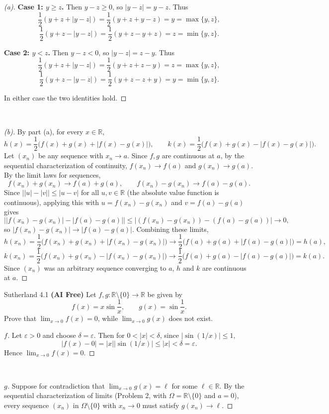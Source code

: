 \documentclass[minion]{homework}
\newcommand{\Reals}{\ensuremath{\mathbb R}}%
\begin{document}
\begin{problems}
\begin{proof}[(a)]
  \textbf{Case 1: $y\ge z$.} Then $y-z\ge0$, so $|y-z|=y-z$. Thus
  $$\frac12(y+z+|y-z|) = \frac12(y+z+y-z) = y = \max\{y,z\},$$
  $$\frac12(y+z-|y-z|) = \frac12(y+z-y+z) = z = \min\{y,z\}.$$

  \textbf{Case 2: $y<z$.} Then $y-z<0$, so $|y-z|=z-y$. Thus
  $$\frac12(y+z+|y-z|) = \frac12(y+z+z-y) = z = \max\{y,z\},$$
  $$\frac12(y+z-|y-z|) = \frac12(y+z-z+y) = y = \min\{y,z\}.$$

  In either case the two identities hold.
\end{proof}$ $
\begin{proof}[(b)]
  By part (a), for every $x\in\Reals$,
  $$h(x) = \frac12\big(f(x)+g(x)+|f(x)-g(x)|\big), \qquad k(x) = \frac12\big(f(x)+g(x)-|f(x)-g(x)|\big).$$
  Let $(x_n)$ be any sequence with $x_n\to a$. Since $f,g$ are continuous at $a$, by the sequential characterization of continuity, $f(x_n)\to f(a)$ and $g(x_n)\to g(a)$. By the limit laws for sequences,
  $$f(x_n)+g(x_n) \to f(a)+g(a), \qquad f(x_n)-g(x_n)\to f(a)-g(a).$$
  Since $\big||u|-|v|\big|\le|u-v|$ for all $u,v\in\Reals$ (the absolute value function is continuous), applying this with $u=f(x_n)-g(x_n)$ and $v=f(a)-g(a)$ gives
  $$\big||f(x_n)-g(x_n)| - |f(a)-g(a)|\big| \le |(f(x_n)-g(x_n))-(f(a)-g(a))| \to 0,$$
  so $|f(x_n)-g(x_n)|\to|f(a)-g(a)|$. Combining these limits,
  $$h(x_n) = \frac12\big(f(x_n)+g(x_n)+|f(x_n)-g(x_n)|\big) \to \frac12\big(f(a)+g(a)+|f(a)-g(a)|\big) = h(a),$$
  $$k(x_n) = \frac12\big(f(x_n)+g(x_n)-|f(x_n)-g(x_n)|\big) \to \frac12\big(f(a)+g(a)-|f(a)-g(a)|\big) = k(a).$$
  Since $(x_n)$ was an arbitrary sequence converging to $a$, $h$ and $k$ are continuous at $a$.
\end{proof}

\problem Sutherland 4.1 \textbf{(AI Free)} \newline
Let $f,g:\Reals\setminus\{0\}\to\Reals$ be given by
\[
f(x) = x\sin\frac1x, \qquad g(x) = \sin\frac1x.
\]
Prove that $\lim_{x\to0} f(x) = 0$, while $\lim_{x\to0} g(x)$ does not exist.
\newline
\begin{proof}[$f$]
  Let $\varepsilon>0$ and choose $\delta=\varepsilon$. Then for $0<|x|<\delta$, since $|\sin(1/x)|\le1$,
  $$|f(x) - 0| = |x||\sin(1/x)| \le |x| < \delta = \varepsilon.$$
  Hence $\lim_{x\to0} f(x) = 0$.
\end{proof}$ $
\begin{proof}[$g$]
  Suppose for contradiction that $\lim_{x\to0} g(x) = \ell$ for some $\ell\in\Reals$. By the sequential characterization of limits (Problem 2, with $\Omega=\Reals\setminus\{0\}$ and $a=0$), every sequence $(x_n)$ in $\Omega\setminus\{0\}$ with $x_n\to0$ must satisfy $g(x_n)\to\ell$.


\end{proof}
\end{problems}
\end{document}
